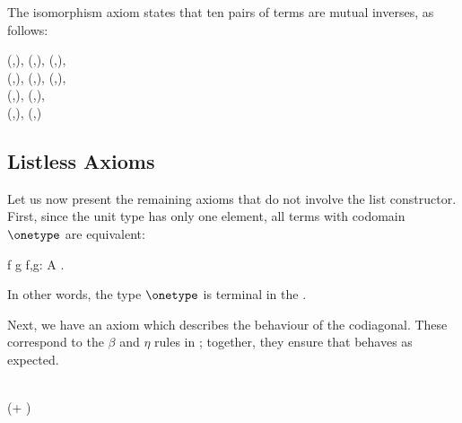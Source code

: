 The isomorphism axiom states that ten pairs of terms are mutual inverses, as follows:
\begin{axiom}
    \label{ax:isomorphisms}
    \begin{casesright}
    (\appendoneterm,\fstterm),
    (\prependoneterm,\sndterm),
    (\assoclterm,\assocrterm),\\
    (\distlterm,\undistlterm),
    (\distrterm,\undistrterm),
    (\consterm,\unconsterm),\\
    (\snocterm,\unsnocterm),
    (\blockterm,\unblockterm), \\
    (\prefterm,\unprefterm), 
    (\shiftlterm,\shiftrterm)
    \end{casesright}
\end{axiom}


\subsection{Listless Axioms}
\label{sec:listless-axioms}
Let us now present the remaining axioms that do not involve the list  constructor. First, since the unit type has only one element, all terms with codomain $\onetype$ are equivalent: 
\begin{axiom}
    \label{ax:unit-type}
    f \equiv g \qquad {} f,g: A \to \onetype.
\end{axiom}
In other words, the type $\onetype$ is terminal in the .

Next, we have an axiom which describes the behaviour of the codiagonal. These correspond to the $\beta$ and $\eta$ rules in \cite[Section 4]{10.1007/BFb0014052}; together, they ensure that  behaves as expected.
\begin{axiom}
        \label{ax:eval-codiag}
        \begin{casesright}
                 \leftterm\comp \codiagterm \equiv \idterm \equiv \rightterm\comp \codiagterm\\
                 (\leftterm + \rightterm)\comp \codiagterm \equiv \idterm
        \end{casesright}
\end{axiom}

